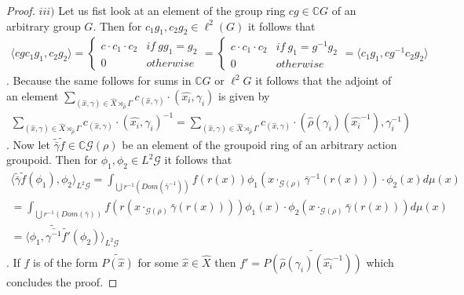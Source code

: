 \documentclass[12pt,a4paper]{scrartcl}
\numberwithin{equation}{section}
\newcommand{\C}{\mathbb{C}} %
\newcommand{\2}{\mathbb{Z} / 2 \mathbb{Z}}
\newcommand{\G}{\mathcal{G}}
\newcommand{\1}{\bar{1}}
\newcommand{\0}{\bar{0}}
\begin{document}
\begin{proof}
	$iii)$ Let us fist look at an element of the group ring $c g \in \C G$ of an arbitrary group $G$. Then for $c_1 g_1, c_2 g_2 \in \ell^2(G)$ it follows that 
	\begin{align*}
		\langle c g c_1 g_1, c_2 g_2 \rangle = \begin{cases}
		 	c \cdot c_1 \cdot c_2 & if \ g g_1 = g_2 \\
		 	0 & otherwise
		\end{cases}  = \begin{cases}
		c \cdot c_1 \cdot c_2 & if \ g_1 = g^{-1} g_2 \\
		0 & otherwise
		\end{cases}
		= \langle  c_1 g_1, c g^{-1} c_2 g_2 \rangle
	\end{align*}.
	Because the same follows for sums in $\C G$ or $\ell^2 G$ it follows that the adjoint of an element $\sum_{(\hat{x}, \gamma) \in \hat{X} \rtimes_{\hat{\rho}} \Gamma} c_{(\hat{x}, \gamma)} \cdot (\hat{x_i}, \gamma_i)$ is given by 
	\begin{align*}
		\sum_{(\hat{x}, \gamma) \in \hat{X} \rtimes_{\hat{\rho}} \Gamma} c_{(\hat{x}, \gamma)} \cdot (\hat{x_i}, \gamma_i)^{-1} = \sum_{(\hat{x}, \gamma) \in \hat{X} \rtimes_{\hat{\rho}} \Gamma} c_{(\hat{x}, \gamma)} \cdot (\hat{\rho}(\gamma_i)(\hat{x_i}^{-1}), \gamma_i^{-1})
	\end{align*}. 
	Now let $\tilde{\bar{\gamma}} \tilde{f} \in \C \G(\rho)$ be an element of the groupoid ring of an arbitrary action groupoid. Then for $\phi_1, \phi_2 \in L^2 \G$ it follows that
	\begin{align*}
		\langle \tilde{\bar{\gamma}} \tilde{f} (\phi_1), \phi_2 \rangle_{L^2 \G} =
		 \int_{\bigcup r^{-1}(Dom(\bar{\gamma}^{-1}))} f(r(x)) \phi_1(x \cdot_{\G (\rho)} \bar{\gamma}^{-1}(r(x))) \cdot \phi_2 (x) d \mu (x) \\
		 = \int_{\bigcup r^{-1}(Dom(\bar{\gamma}))} f(r(x \cdot_{\G (\rho)} \bar{\gamma}(r(x)))) \phi_1(x ) \cdot \phi_2 (x \cdot_{\G (\rho)} \bar{\gamma}(r(x))) d \mu (x) \\
		 = \langle \phi_1 ,\tilde{\bar{\gamma^{-1}}} \tilde{f'} (\phi_2) \rangle_{L^2 \G}
	\end{align*}.
	If $f$ is of the form $\widetilde{P(\hat{x})}$ for some $\hat{x} \in \hat{X}$ then $f' = \widetilde{P(\hat{\rho}(\gamma_i)(\hat{x_i}^{-1}))}$  which concludes the proof.
\end{proof}
\end{document}
